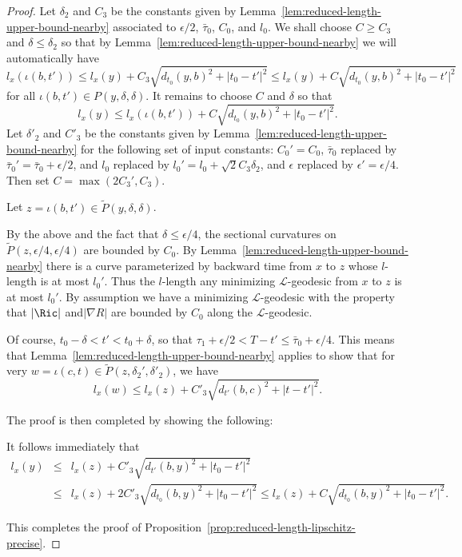 \begin{proof}
\sketch
{}
Let $\delta_2$ and $C_3$ be the constants given by
Lemma~\ref{lem:reduced-length-upper-bound-nearby} associated to $\epsilon/2$, $\bar\tau_0$, $C_0$,
and $l_0$. We shall choose $C\ge C_3$ and $\delta\le \delta_2$ so
that by Lemma~\ref{lem:reduced-length-upper-bound-nearby} we will automatically have
$$l_x(\iota(b,t'))\le l_x(y)+C_3\sqrt{d_{t_0}(y,b)^2+|t_0-t'|^2}
\le l_x(y)+C\sqrt{d_{t_0}(y,b)^2+|t_0-t'|^2}$$ for all
$\iota(b,t')\in P(y,\delta,\delta)$. It remains to choose $C$ and
$\delta$ so that
$$l_x(y)\le l_x(\iota(b,t'))+C\sqrt{d_{t_0}(y,b)^2+|t_0-t'|^2}.$$
 Let
$\delta'_2$ and $ C'_3$ be the constants given by
Lemma~\ref{lem:reduced-length-upper-bound-nearby} for the following set of input constants:
$C_0'=C_0$, $\bar\tau_0$ replaced by
$\bar\tau_0'=\bar\tau_0+\epsilon/2$, and $l_0$ replaced by
$l_0'=l_0+\sqrt{2}C_3\delta_2$, and $\epsilon$ replaced by
$\epsilon'=\epsilon/4$. Then set $C=\max(2C_3',C_3)$.

Let $z=\iota(b,t')\in \widetilde P(y,\delta,\delta)$.



 By
the above and the fact that $ \delta\le\epsilon/4$, the sectional
curvatures on $\widetilde P(z,\epsilon/4,\epsilon/4)$ are bounded by
$C_0$. By Lemma~\ref{lem:reduced-length-upper-bound-nearby} there is a curve parameterized by
backward time from $x$ to $z$ whose $l$-length is at most $l_0'$.
Thus the $l$-length any minimizing ${\mathcal L}$-geodesic from $x$
to $z$ is at most $l_0'$. By assumption we have a minimizing
${\mathcal L}$-geodesic with the property that  $|\Ric|$
and$|\nabla R|$ are bounded by $C_0$ along the ${\mathcal
L}$-geodesic.

Of course, $t_0-\delta<t'<t_0+\delta$, so that
$\tau_1+\epsilon/2<T-t'\le \bar\tau_0+\epsilon/4$. This means that
Lemma~\ref{lem:reduced-length-upper-bound-nearby} applies to show that for very $w=\iota(c,t)\in
\widetilde P(z,\delta_2',\delta'_2)$,  we have
$$l_x(w)\le l_x(z)+C'_3\sqrt{d_{t'}(b,c)^2+|t-t'|^2}.$$


The proof is then completed by showing the following:



It follows immediately that \begin{eqnarray*} l_x(y) & \le &
l_x(z)+C'_3\sqrt{d_{t'}(b,y)^2+|t_0-t'|^2} \\ & \le & l_x(z)+2
C'_3\sqrt{d_{t_0}(b,y)^2+|t_0-t'|^2}\le
l_x(z)+C\sqrt{d_{t_0}(b,y)^2+|t_0-t'|^2}.
\end{eqnarray*}

This completes the proof of Proposition~\ref{prop:reduced-length-lipschitz-precise}.
\end{proof}

